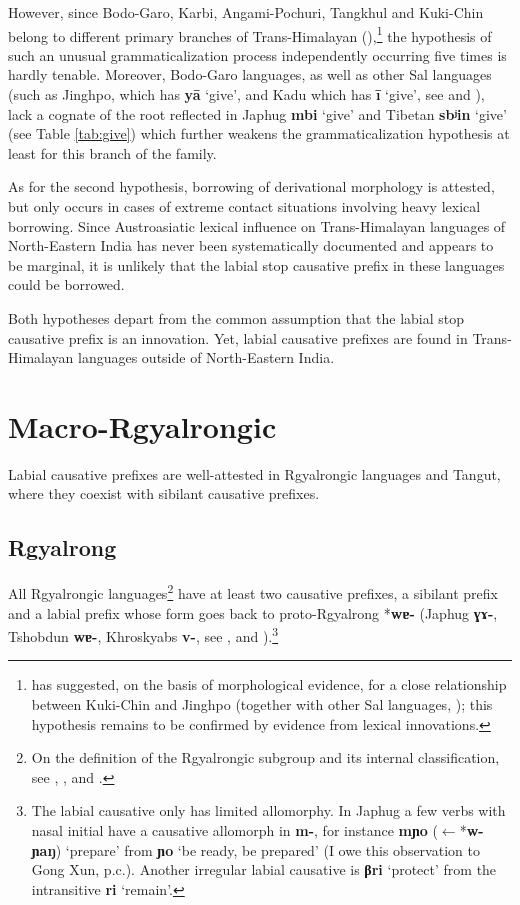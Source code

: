 \documentclass[oneside,a4paper,11pt]{article}
\newcommand{\ipa}[1]{\textbf{{\phon\mbox{#1}}}} %
\newcommand{\forme}[2]{\ipa{#1} `#2'}
\begin{document}
However, since  Bodo-Garo, Karbi, Angami-Pochuri, Tangkhul and Kuki-Chin belong to different primary branches of Trans-Himalayan (\citealt{post14th}),\footnote{\citet{delancey15central} has suggested, on the basis of morphological evidence, for a close relationship between Kuki-Chin and Jinghpo (together with other Sal languages, \citealt{burling83sal}); this hypothesis remains to be confirmed by evidence from lexical innovations.} the hypothesis of such an unusual grammaticalization process independently occurring five times is hardly tenable. Moreover, Bodo-Garo languages, as well as other Sal languages (such as Jinghpo, which has \ipa{yā} `give', and Kadu which has \ipa{ī} `give', see \citealt{xu83jingpo} and \citealt{sangdong12kadu}),  lack a cognate of the root reflected in Japhug \forme{mbi}{give} and Tibetan \forme{sbʲin}{give} (see Table \ref{tab:give}) which further weakens the grammaticalization hypothesis at least for this branch of the family.

As for the second hypothesis, borrowing of derivational morphology is attested, but only occurs in cases of extreme contact situations involving heavy lexical borrowing. Since Austroasiatic lexical influence on Trans-Himalayan languages of North-Eastern India has never been systematically documented and appears to be marginal, it is unlikely that the labial stop causative prefix in these languages could be borrowed.

Both hypotheses depart from the common assumption that the labial stop causative prefix is an innovation. Yet, labial causative prefixes are found in Trans-Himalayan languages outside of North-Eastern India. 

\section{Macro-Rgyalrongic}
Labial causative prefixes are well-attested in Rgyalrongic languages and Tangut, where they coexist with sibilant causative prefixes.

\subsection{Rgyalrong} \label{sec:japhug}
All Rgyalrongic languages\footnote{On the definition of the Rgyalrongic subgroup and its internal classification, see \citet{jackson00sidaba}, \citet{jackson00puxi}, \citet{jacques14esquisse} and \citet{lai15person}.} have at least two causative prefixes, a sibilant prefix and a labial prefix whose form goes back to proto-Rgyalrong *\ipa{wɐ-} (Japhug \ipa{ɣɤ-}, Tshobdun \ipa{wɐ-}, Khroskyabs \ipa{v-}, see \citealt[322]{jacques04these}, \citealt{jackson06paisheng} and \citealt[369]{lai17khroskyabs}).\footnote{The labial causative only has limited allomorphy. In Japhug a few verbs with nasal initial have a causative allomorph in \ipa{m-}, for instance \ipa{mɲo} ($\leftarrow$*\ipa{w-ɲaŋ}) `prepare' from \forme{ɲo}{be ready, be prepared} (I owe this observation to Gong Xun, p.c.). Another irregular labial causative is \ipa{βri} `protect' from the intransitive \ipa{ri} `remain'.}
\end{document}
